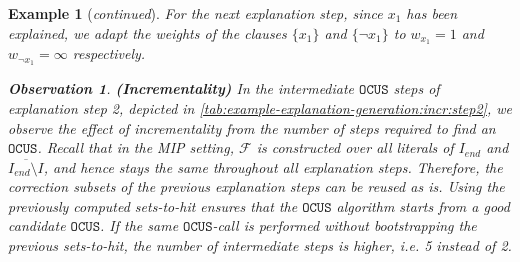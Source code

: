 \documentclass[twoside,11pt]{article}
\newcommand\m[1]{\mathcal{#1}}
\newtheorem{example}{Example}
\newtheorem{observation}[obs]{Observation}
\newcommand\comment[1]{\marginpar{\tiny #1}}
\renewcommand\comment[1]{#1}
\newcommand{\tias}[1]{{\comment{\color{blue}Tias:#1}}}
\newcommand{\bart}[1]{{\comment{\color{OliveGreen}Bart: #1}}}
\newcommand\setstohit{\ensuremath{\m{H} }\xspace}
\newcommand\Iend{\ensuremath{I_\mathit{end} }\xspace}
\newcommand\formula{\ensuremath{\m{F} }\xspace}
\newcommand\mm[1]{\ensuremath{#1}\xspace}
\newcommand\call[1]{\mm{\texttt{#1}}}
\newcommand\comus{\mm{\call{OCUS}}}
\newcommand\satsets{\mm{\mathbf{SSs}}}
\begin{document}
\begin{example}[\textit{continued}]
For the next explanation step, since $x_1$ has been explained, we adapt the weights of the clauses $\{x_1\}$ and $\{\lnot x_1\}$ to $w_{x_1} = 1$ and $w_{\lnot x_1} = \infty$ respectively. 







\begin{observation}\textbf{(Incrementality)}
In the intermediate \comus steps of explanation step 2, depicted in \cref{tab:example-explanation-generation:incr:step2}, we observe the effect of incrementality from the number of steps required to find an \comus. 
Recall that in the MIP setting,  \formula is constructed over all literals of $\Iend$ and $\overline{\Iend \setminus I}$, and hence stays the same throughout all explanation steps. Therefore, the correction subsets of the previous explanation steps can be reused as is.
Using the previously computed sets-to-hit ensures that the \comus algorithm starts from a good candidate \comus. If the same \comus-call is performed without bootstrapping the previous sets-to-hit, the number of intermediate steps is higher, i.e. 5 instead of 2.
\end{observation}


\end{example}
\end{document}
